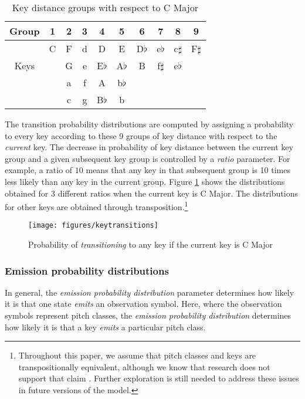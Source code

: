 \documentclass[sigconf]{acmart}
\begin{document}
\begin{table}[ht]
  \caption{Key distance groups with respect to C Major}
  \label{tab:keyclusters}
  \begin{tabular}{c|ccccccccc}
    Group & 1 & 2 & 3 & 4        & 5        & 6        & 7         & 8         & 9\\
    \toprule
          & C & F & d & D        & E        & D$\flat$ & e$\flat$  & c$\sharp$ & F$\sharp$\\
    Keys  &   & G & e & E$\flat$ & A$\flat$ & B        & f$\sharp$ & e$\flat$\\
          &   & a & f & A        & b$\flat$\\
          &   & c & g & B$\flat$ & b\\
\end{tabular}
\end{table}

The transition probability distributions are computed by assigning a probability to every key according to these 9 groups of key distance with respect to the \emph{current} key. The decrease in probability of key distance between the current key group and a given subsequent key group is controlled by a \emph{ratio} parameter. For example, a ratio of $10$ means that any key in that subsequent group is 10 times less likely than any key in the current group.
Figure \ref{fig:keytransitions} shows the distributions obtained for 3 different ratios when the current key is C Major. The distributions for other keys are obtained through transposition.\footnote{Throughout this paper, we assume that pitch classes and keys are transpositionally equivalent, although we know that research does not support that claim \cite{quinn2017}. Further exploration is still needed to address these issues in future versions of the model.}

\begin{figure}[ht]
  \centering
  \texttt{[image: figures/keytransitions]}
  \caption{Probability of \emph{transitioning} to any key if the current key is C Major}
  \label{fig:keytransitions}
\end{figure}

\subsubsection{Emission probability distributions}
In general, the \emph{emission probability distribution} parameter determines how likely it is that one state \emph{emits} an observation symbol. Here, where the observation symbols represent pitch classes, the \emph{emission probability distribution} determines how likely it is that a key \emph{emits} a particular pitch class.
\end{document}

